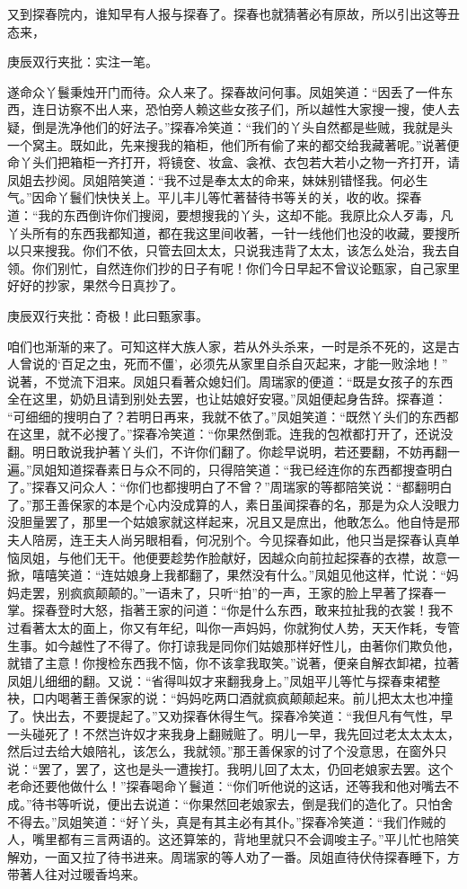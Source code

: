 \begin{parag}
    又到探春院内，谁知早有人报与探春了。探春也就猜著必有原故，所以引出这等丑态来，\begin{note}庚辰双行夹批：实注一笔。\end{note}遂命众丫鬟秉烛开门而待。众人来了。探春故问何事。凤姐笑道：“因丢了一件东西，连日访察不出人来，恐怕旁人赖这些女孩子们，所以越性大家搜一搜，使人去疑，倒是洗净他们的好法子。”探春冷笑道：“我们的丫头自然都是些贼，我就是头一个窝主。既如此，先来搜我的箱柜，他们所有偷了来的都交给我藏著呢。”说著便命丫头们把箱柜一齐打开，将镜奁、妆盒、衾袱、衣包若大若小之物一齐打开，请凤姐去抄阅。凤姐陪笑道：“我不过是奉太太的命来，妹妹别错怪我。何必生气。”因命丫鬟们快快关上。平儿丰儿等忙著替待书等关的关，收的收。探春道：“我的东西倒许你们搜阅，要想搜我的丫头，这却不能。我原比众人歹毒，凡丫头所有的东西我都知道，都在我这里间收著，一针一线他们也没的收藏，要搜所以只来搜我。你们不依，只管去回太太，只说我违背了太太，该怎么处治，我去自领。你们别忙，自然连你们抄的日子有呢！你们今日早起不曾议论甄家，自己家里好好的抄家，果然今日真抄了。\begin{note}庚辰双行夹批：奇极！此曰甄家事。\end{note}咱们也渐渐的来了。可知这样大族人家，若从外头杀来，一时是杀不死的，这是古人曾说的‘百足之虫，死而不僵’，必须先从家里自杀自灭起来，才能一败涂地！” 说著，不觉流下泪来。凤姐只看著众媳妇们。周瑞家的便道：“既是女孩子的东西全在这里，奶奶且请到别处去罢，也让姑娘好安寝。”凤姐便起身告辞。探春道： “可细细的搜明白了？若明日再来，我就不依了。”凤姐笑道：“既然丫头们的东西都在这里，就不必搜了。”探春冷笑道：“你果然倒乖。连我的包袱都打开了，还说没翻。明日敢说我护著丫头们，不许你们翻了。你趁早说明，若还要翻，不妨再翻一遍。”凤姐知道探春素日与众不同的，只得陪笑道：“我已经连你的东西都搜查明白了。”探春又问众人：“你们也都搜明白了不曾？”周瑞家的等都陪笑说：“都翻明白了。”那王善保家的本是个心内没成算的人，素日虽闻探春的名，那是为众人没眼力没胆量罢了，那里一个姑娘家就这样起来，况且又是庶出，他敢怎么。他自恃是邢夫人陪房，连王夫人尚另眼相看，何况别个。今见探春如此，他只当是探春认真单恼凤姐，与他们无干。他便要趁势作脸献好，因越众向前拉起探春的衣襟，故意一掀，嘻嘻笑道：“连姑娘身上我都翻了，果然没有什么。”凤姐见他这样，忙说：“妈妈走罢，别疯疯颠颠的。”一语未了，只听“拍”的一声，王家的脸上早著了探春一掌。探春登时大怒，指著王家的问道：“你是什么东西，敢来拉扯我的衣裳！我不过看著太太的面上，你又有年纪，叫你一声妈妈，你就狗仗人势，天天作耗，专管生事。如今越性了不得了。你打谅我是同你们姑娘那样好性儿，由著你们欺负他，就错了主意！你搜检东西我不恼，你不该拿我取笑。”说著，便亲自解衣卸裙，拉著凤姐儿细细的翻。又说：“省得叫奴才来翻我身上。”凤姐平儿等忙与探春束裙整袂，口内喝著王善保家的说：“妈妈吃两口酒就疯疯颠颠起来。前儿把太太也冲撞了。快出去，不要提起了。”又劝探春休得生气。探春冷笑道：“我但凡有气性，早一头碰死了！不然岂许奴才来我身上翻贼赃了。明儿一早，我先回过老太太太太，然后过去给大娘陪礼，该怎么，我就领。”那王善保家的讨了个没意思，在窗外只说：“罢了，罢了，这也是头一遭挨打。我明儿回了太太，仍回老娘家去罢。这个老命还要他做什么！”探春喝命丫鬟道：“你们听他说的这话，还等我和他对嘴去不成。”待书等听说，便出去说道：“你果然回老娘家去，倒是我们的造化了。只怕舍不得去。”凤姐笑道：“好丫头，真是有其主必有其仆。”探春冷笑道：“我们作贼的人，嘴里都有三言两语的。这还算笨的，背地里就只不会调唆主子。”平儿忙也陪笑解劝，一面又拉了待书进来。周瑞家的等人劝了一番。凤姐直待伏侍探春睡下，方带著人往对过暖香坞来。

\end{parag}
